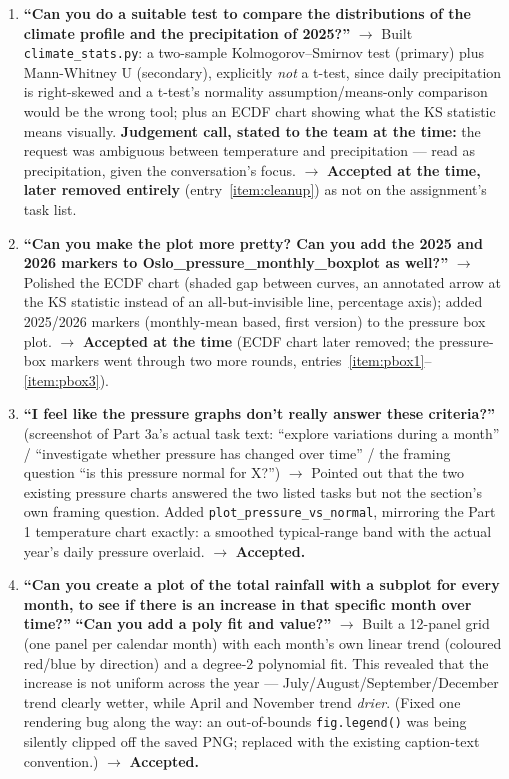\begin{enumerate}[leftmargin=*, itemsep=0.8em]
\item \textbf{``Can you do a suitable test to compare the distributions of the climate
profile and the precipitation of 2025?''}
$\rightarrow$ Built \texttt{climate\_stats.py}: a two-sample Kolmogorov--Smirnov test
(primary) plus Mann-Whitney U (secondary), explicitly \emph{not} a t-test, since daily
precipitation is right-skewed and a t-test's normality assumption/means-only comparison would
be the wrong tool; plus an ECDF chart showing what the KS statistic means visually.
\textbf{Judgement call, stated to the team at the time:} the request was ambiguous between
temperature and precipitation --- read as precipitation, given the conversation's focus.
$\rightarrow$ \textbf{Accepted at the time, later removed entirely}
(entry~\ref{item:cleanup}) as not on the assignment's task list.

\item \textbf{``Can you make the plot more pretty? Can you add the 2025 and 2026 markers to
Oslo\_pressure\_monthly\_boxplot as well?''}
$\rightarrow$ Polished the ECDF chart (shaded gap between curves, an annotated arrow at the
KS statistic instead of an all-but-invisible line, percentage axis); added 2025/2026 markers
(monthly-mean based, first version) to the pressure box plot.
$\rightarrow$ \textbf{Accepted at the time} (ECDF chart later removed; the pressure-box
markers went through two more rounds, entries~\ref{item:pbox1}--\ref{item:pbox3}).

\item \textbf{``I feel like the pressure graphs don't really answer these criteria?''}
(screenshot of Part 3a's actual task text: ``explore variations during a month'' /
``investigate whether pressure has changed over time'' / the framing question ``is this
pressure normal for X?'')
$\rightarrow$ Pointed out that the two existing pressure charts answered the two listed
tasks but not the section's own framing question. Added \texttt{plot\_pressure\_vs\_normal},
mirroring the Part 1 temperature chart exactly: a smoothed typical-range band with the actual
year's daily pressure overlaid.
$\rightarrow$ \textbf{Accepted.}

\item \textbf{``Can you create a plot of the total rainfall with a subplot for every month,
to see if there is an increase in that specific month over time?''} \textbf{``Can you add a
poly fit and value?''}
$\rightarrow$ Built a 12-panel grid (one panel per calendar month) with each month's own
linear trend (coloured red/blue by direction) and a degree-2 polynomial fit. This revealed
that the increase is not uniform across the year --- July/August/September/December trend
clearly wetter, while April and November trend \emph{drier}. (Fixed one rendering bug along
the way: an out-of-bounds \texttt{fig.legend()} was being silently clipped off the saved PNG;
replaced with the existing caption-text convention.)
$\rightarrow$ \textbf{Accepted.}


\end{enumerate}
